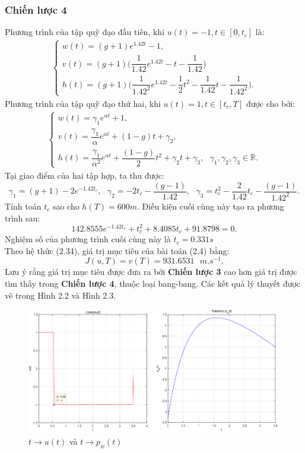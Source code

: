 \documentclass[12pt,a4paper]{report}
\begin{document}
\subsubsection{Chiến lược 4}
Phương trình của tập quỹ đạo đầu tiên, khi $u(t) = -1, t\in[0, t_c]$ là: \begin{eqnarray}
	\begin{cases}
		w(t) = (g+1)e^{1.42t}-1, \\ v(t) = (g+1)\bigg(\dfrac{1}{1.42}e^{1.42t}-t-\dfrac{1}{1.42}\bigg) \\ h(t) = (g+1)\bigg(\dfrac{1}{1.42^2}e^{1.42t}-\dfrac{1}{2}t^2-\dfrac{1}{1.42}t - \dfrac{1}{1.42^2}\bigg).
	\end{cases}
\end{eqnarray}
Phương trình của tập quỹ đạo thứ hai, khi $u(t) = 1, t \in[t_c, T]$ được cho bởi: \begin{eqnarray}
	\begin{cases}
		w(t) = \gamma_1e^{\alpha t} + 1, \\ v(t) = \dfrac{\gamma_1}{\alpha}e^{\alpha t} + (1-g)t + \gamma_2, \\ h(t) = \dfrac{\gamma_1}{\alpha^2}e^{\alpha t} + \dfrac{(1-g)}{2}t^2 + \gamma_2t + \gamma_3, \text{ } \gamma_1, \gamma_2, \gamma_3 \in \mathbb{R}. 
	\end{cases}
\end{eqnarray}
Tại giao điểm của hai tập hợp, ta thu được: $$\gamma_1 = (g+1) - 2e^{-1.42t_c}, \text{ } \gamma_2 = -2t_c - \dfrac{(g-1)}{1.42}, \text{ } \gamma_3=t_c^2 - \dfrac{2}{1.42}t_c-\dfrac{(g-1)}{1.42^2}.$$ Tính toán $t_c$ sao cho $h(T) = 600m$. Điều kiện cuối cùng này tạo ra phương trình sau:
\begin{equation}
	142.8555e^{-1.42t_c} + t_c^2 + 8.4085t_c + 91.8798 = 0.
\end{equation} Nghiệm số của phương trình cuối cùng này là $t_c = 0.331s$\\Theo hệ thức (2.34), giá trị mục tiêu của bài toán (2.4) bằng: $$J(u, T) = v(T) = 931.6531 \text
{ } m.s^{-1}.$$ Lưu ý rằng giá trị mục tiêu được đưa ra bởi \textbf{Chiến lược 3} cao hơn giá trị được tìm thấy trong \textbf{Chiến lược 4}, thuộc loại bang-bang. Các kết quả lý thuyết được vẽ trong Hình 2.2 và Hình 2.3.
\begin{figure}[h]
	\centering
	\includegraphics[scale=.6]{./image/hinh2.png}
	\caption{$t \to u(t)$ và $t \to p_w(t)$}
\end{figure}
\end{document}
